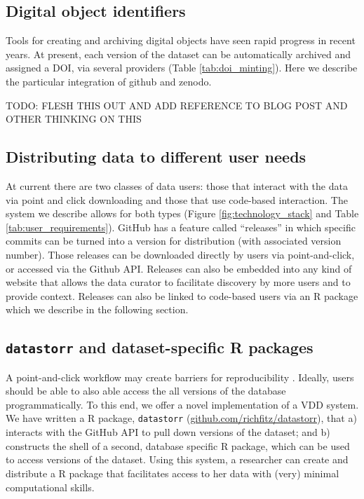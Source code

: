 \documentclass[a4paper,11pt]{article}
\newcommand{\smurl}[1]{{\footnotesize\url{#1}}}
\begin{document}
\subsection{Digital object identifiers}


Tools for creating and archiving digital objects have seen rapid progress in recent years.  At present, each version of the dataset can be automatically archived and assigned a DOI, via several providers (Table \ref{tab:doi_minting}).  Here we describe the particular integration of github and zenodo.  

TODO: FLESH THIS OUT AND ADD REFERENCE TO BLOG POST AND OTHER THINKING ON THIS


\subsection{Distributing data to different user needs}

At current there are two classes of data users: those that  interact with the data via point and click downloading and those that use code-based interaction.  The system we describe allows for both types (Figure \ref{fig:technology_stack} and Table \ref{tab:user_requirements}).  GitHub has a feature called ``releases'' in which specific commits can be turned into a version for distribution (with associated version number).  Those releases can be downloaded directly by users via point-and-click, or accessed via the Github API. Releases can also be embedded into any kind of website that allows the data curator to facilitate discovery by more users and to provide context.  Releases can also be linked to code-based users via an R package which we describe in the following section.

\subsection{\texttt{datastorr} and dataset-specific R packages}

A point-and-click workflow may create barriers for reproducibility \cite{Wilson-2014,Lowndes-2017}. Ideally, users should be able to also able access the all versions of the database programmatically. To this end, we offer a novel implementation of a VDD system. We have written a R package, \texttt{datastorr} (\smurl{github.com/richfitz/datastorr}), that a) interacts with the GitHub API to pull down versions of the dataset; and b) constructs the shell of a second, database specific R package, which can be used to access versions of the dataset. Using this system, a researcher can create and distribute a R package that facilitates access to her data with (very) minimal computational skills.
\end{document}
